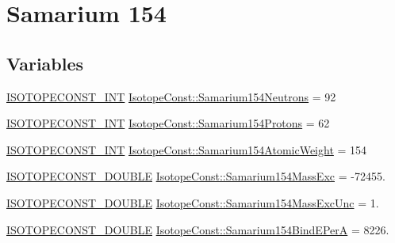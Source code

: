 \hypertarget{group___isotope_const-_samarium-_sm154}{}\section{Samarium 154}
\label{group___isotope_const-_samarium-_sm154}
\subsection*{Variables}
\begin{DoxyCompactItemize}
\item 
\mbox{\hyperlink{group___isotope_const-_macros_ga5f18360b3e99483a35c32d789e62621c}{I\+S\+O\+T\+O\+P\+E\+C\+O\+N\+S\+T\+\_\+\+I\+NT}} \mbox{\hyperlink{group___isotope_const-_samarium-_sm154_ga279e1d56546868e46080f6e8612df7c4}{Isotope\+Const\+::\+Samarium154\+Neutrons}} = 92
\item 
\mbox{\hyperlink{group___isotope_const-_macros_ga5f18360b3e99483a35c32d789e62621c}{I\+S\+O\+T\+O\+P\+E\+C\+O\+N\+S\+T\+\_\+\+I\+NT}} \mbox{\hyperlink{group___isotope_const-_samarium-_sm154_gaa9cb481d33fab3d28db29e30f3db6782}{Isotope\+Const\+::\+Samarium154\+Protons}} = 62
\item 
\mbox{\hyperlink{group___isotope_const-_macros_ga5f18360b3e99483a35c32d789e62621c}{I\+S\+O\+T\+O\+P\+E\+C\+O\+N\+S\+T\+\_\+\+I\+NT}} \mbox{\hyperlink{group___isotope_const-_samarium-_sm154_gad85bcdc2ce20975822de02a4fcc42a7d}{Isotope\+Const\+::\+Samarium154\+Atomic\+Weight}} = 154
\item 
\mbox{\hyperlink{group___isotope_const-_macros_ga8f45a7272ce02c0b4c65c44636ed719a}{I\+S\+O\+T\+O\+P\+E\+C\+O\+N\+S\+T\+\_\+\+D\+O\+U\+B\+LE}} \mbox{\hyperlink{group___isotope_const-_samarium-_sm154_ga38600c488f20d0e425d06bbd84632bcf}{Isotope\+Const\+::\+Samarium154\+Mass\+Exc}} = -\/72455.
\item 
\mbox{\hyperlink{group___isotope_const-_macros_ga8f45a7272ce02c0b4c65c44636ed719a}{I\+S\+O\+T\+O\+P\+E\+C\+O\+N\+S\+T\+\_\+\+D\+O\+U\+B\+LE}} \mbox{\hyperlink{group___isotope_const-_samarium-_sm154_ga837f24bd26dcb7db3aba86ae63b0d468}{Isotope\+Const\+::\+Samarium154\+Mass\+Exc\+Unc}} = 1.
\item 
\mbox{\hyperlink{group___isotope_const-_macros_ga8f45a7272ce02c0b4c65c44636ed719a}{I\+S\+O\+T\+O\+P\+E\+C\+O\+N\+S\+T\+\_\+\+D\+O\+U\+B\+LE}} \mbox{\hyperlink{group___isotope_const-_samarium-_sm154_ga8ac043d366b8851d70d68aa80e71bbf3}{Isotope\+Const\+::\+Samarium154\+Bind\+E\+PerA}} = 8226.
\item 

\end{DoxyCompactItemize}
